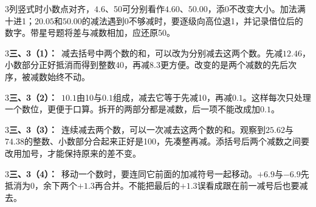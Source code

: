 \documentclass[multi=snippet,border={5bp 20bp 5bp 5bp}]{standalone}
\newenvironment{snippet}[3]{\begin{minipage}{#1bp}\color{answerred}\fontsize{#2}{#3}\selectfont\raggedright}{\end{minipage}}
\begin{document}
\begin{snippet}{505}{11.5}{14}\begin{multicols}{3}\raggedcolumns 列竖式时小数点对齐，\(4.6\)\allowbreak 、50可分别看作\(4.60\)\allowbreak 、\(50.00\)\allowbreak ，添0不改变大小。加法满十进1；\(20.05\)\allowbreak 和\(50.00\)\allowbreak 的减法遇到0不够减时，要逐级向高位退1，并记录借位后的数字。带星号题将差与减数相加，应还原50。\end{multicols}\end{snippet}
\begin{snippet}{505}{11.5}{14}\begin{multicols}{3}\raggedcolumns \textbf{三、3（1）：}\ 减去括号中两个数的和，可以改为分别减去这两个数。先减\(12.46\)\allowbreak ，小数部分正好抵消而得到整数40，再减\(8.3\)\allowbreak 更方便。改变的是两个减数的先后次序，被减数始终不动。\end{multicols}\end{snippet}
\begin{snippet}{505}{11.5}{14}\begin{multicols}{3}\raggedcolumns \textbf{三、3（2）：}\ \(10.1\)\allowbreak 由10与\(0.1\)\allowbreak 组成，减去它等于先减10，再减\(0.1\)\allowbreak 。这样每次只处理一个数位，更便于口算。拆开的两部分都是减数，后一项不能改成加\(0.1\)\allowbreak 。\end{multicols}\end{snippet}
\begin{snippet}{505}{11.5}{14}\begin{multicols}{3}\raggedcolumns \textbf{三、3（3）：}\ 连续减去两个数，可以一次减去这两个数的和。观察到\(25.62\)\allowbreak 与\(74.38\)\allowbreak 的整数、小数部分合起来正好是100，先凑整再减。添括号后两个减数之间要改用加号，才能保持原来的差不变。\end{multicols}\end{snippet}
\begin{snippet}{505}{11.5}{14}\begin{multicols}{3}\raggedcolumns \textbf{三、3（4）：}\ 移动一个数时，要连同它前面的加减符号一起移动。\(+6.9\)\allowbreak 与\(-6.9\)\allowbreak 先抵消为0，余下两个\(+1.3\)\allowbreak 再合并。不能把最后的\(+1.3\)\allowbreak 误看成跟在前一减号后也要减去。\end{multicols}\end{snippet}
\end{document}
